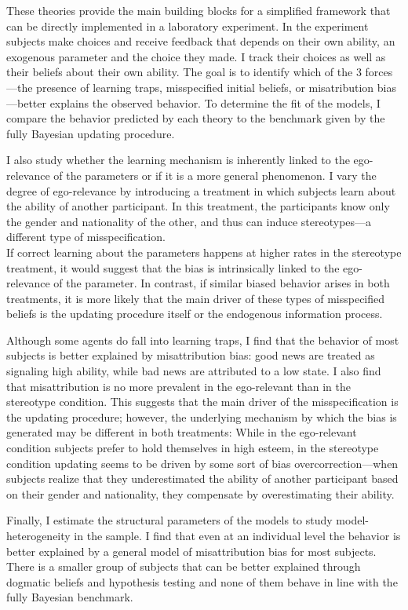 \documentclass[
  12pt,
]{article}
\begin{document}
These theories provide the main building blocks for a simplified
framework that can be directly implemented in a laboratory experiment.
In the experiment subjects make choices and receive feedback that
depends on their own ability, an exogenous parameter and the choice they
made. I track their choices as well as their beliefs about their own
ability. The goal is to identify which of the 3 forces---the presence of
learning traps, misspecified initial beliefs, or misatribution
bias---better explains the observed behavior. To determine the fit of
the models, I compare the behavior predicted by each theory to the
benchmark given by the fully Bayesian updating procedure.

I also study whether the learning mechanism is inherently linked to the
ego-relevance of the parameters or if it is a more general phenomenon. I
vary the degree of ego-relevance by introducing a treatment in which
subjects learn about the ability of another participant. In this
treatment, the participants know only the gender and nationality of the
other, and thus can induce stereotypes---a different type of
misspecification.\\
If correct learning about the parameters happens at higher rates in the
stereotype treatment, it would suggest that the bias is intrinsically
linked to the ego-relevance of the parameter. In contrast, if similar
biased behavior arises in both treatments, it is more likely that the
main driver of these types of misspecified beliefs is the updating
procedure itself or the endogenous information process.

Although some agents do fall into learning traps, I find that the
behavior of most subjects is better explained by misattribution bias:
good news are treated as signaling high ability, while bad news are
attributed to a low state. I also find that misattribution is no more
prevalent in the ego-relevant than in the stereotype condition. This
suggests that the main driver of the misspecification is the updating
procedure; however, the underlying mechanism by which the bias is
generated may be different in both treatments: While in the ego-relevant
condition subjects prefer to hold themselves in high esteem, in the
stereotype condition updating seems to be driven by some sort of bias
overcorrection---when subjects realize that they underestimated the
ability of another participant based on their gender and nationality,
they compensate by overestimating their ability.

Finally, I estimate the structural parameters of the models to study
model-heterogeneity in the sample. I find that even at an individual
level the behavior is better explained by a general model of
misattribution bias for most subjects. There is a smaller group of
subjects that can be better explained through dogmatic beliefs and
hypothesis testing and none of them behave in line with the fully
Bayesian benchmark.
\end{document}
